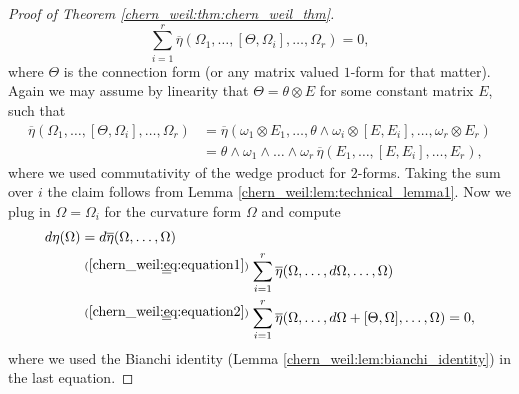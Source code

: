 \begin{proof}[Proof of Theorem \ref{chern_weil:thm:chern_weil_thm}]
    \begin{equation}
        \label{chern_weil:eq:equation2}
    \sum_{i=1}^{r} \overline{\eta}(\Omega_1,\ldots,[\Theta,\Omega_i],\ldots, \Omega_r) = 0,
    \end{equation}
    where $\Theta$ is the connection form (or any matrix valued $1$-form for that matter). Again we may assume by linearity that $\Theta = \theta \otimes E$ for some constant matrix $E$, such that 
    \begin{align*}
        \overline{\eta}(\Omega_1,\ldots,[\Theta,\Omega_i],\ldots, \Omega_r) & = \overline{\eta}(\omega_1 \otimes E_1,\ldots, \theta \wedge \omega_i \otimes [E,E_i], \ldots, \omega_r \otimes E_r) \\
        & = \theta \wedge \omega_1 \wedge \ldots \wedge \omega_r \, \overline{\eta}(E_1,\ldots,[E,E_i],\ldots,E_r),
    \end{align*}
    where we used commutativity of the wedge product for $2$-forms. Taking the sum over $i$ the claim follows from Lemma \ref{chern_weil:lem:technical_lemma1}. Now we plug in $\Omega = \Omega_i$ for the curvature form $\Omega$ and compute 
    \begin{align*}
        d \eta(\Omega) & = d\overline{\eta}(\Omega,\ldots,\Omega) \\
            & \oset[4pt]{(\ref{chern_weil:eq:equation1})}{=} \sum_{i=1}^{r} \overline{\eta}(\Omega,\ldots,d\Omega,\ldots,\Omega) \\
            & \oset[4pt]{(\ref{chern_weil:eq:equation2})}{=} \sum_{i=1}^{r} \overline{\eta}(\Omega,\ldots,d\Omega + [\Theta,\Omega],\ldots,\Omega) = 0,
    \end{align*}
    where we used the Bianchi identity (Lemma \ref{chern_weil:lem:bianchi_identity}) in the last equation.


\end{proof}
